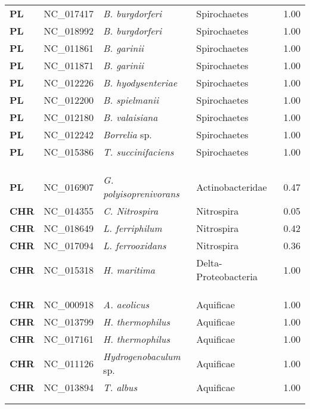 \begin{adjustwidth}{-3cm}{2cm}
{\begin{supertabular}{>{\bfseries}l|p{0.1\textwidth}p{0.14\textwidth}l|l}
PL & NC\_017417 & \textit{B. burgdorferi} & Spirochaetes & 1.00\\
PL & NC\_018992 & \textit{B. burgdorferi} & Spirochaetes & 1.00\\
PL & NC\_011861 & \textit{B. garinii} & Spirochaetes & 1.00\\
PL & NC\_011871 & \textit{B. garinii} & Spirochaetes & 1.00\\
PL & NC\_012226 & \textit{B. hyodysenteriae} & Spirochaetes & 1.00\\
PL & NC\_012200 & \textit{B. spielmanii} & Spirochaetes & 1.00\\
PL & NC\_012180 & \textit{B. valaisiana} & Spirochaetes & 1.00\\
PL & NC\_012242 & \textit{Borrelia} sp. & Spirochaetes & 1.00\\
PL & NC\_015386 & \textit{T. succinifaciens} & Spirochaetes & 1.00\\
\\
\\
\hline\\
PL & NC\_016907 & \textit{G. polyisoprenivorans} & Actinobacteridae & 0.47\\
CHR & NC\_014355 & \textit{C. Nitrospira} & Nitrospira & 0.05\\
CHR & NC\_018649 & \textit{L. ferriphilum} & Nitrospira & 0.42\\
CHR & NC\_017094 & \textit{L. ferrooxidans} & Nitrospira & 0.36\\
CHR & NC\_015318 & \textit{H. maritima} & Delta-Proteobacteria & 1.00\\
\\
\\
\hline\\
CHR & NC\_000918 & \textit{A. aeolicus} & Aquificae & 1.00\\
CHR & NC\_013799 & \textit{H. thermophilus} & Aquificae & 1.00\\
CHR & NC\_017161 & \textit{H. thermophilus} & Aquificae & 1.00\\
CHR & NC\_011126 & \textit{Hydrogenobaculum} sp. & Aquificae & 1.00\\
CHR & NC\_013894 & \textit{T. albus} & Aquificae & 1.00\\
\\
\\

\end{supertabular}}
\end{adjustwidth}
